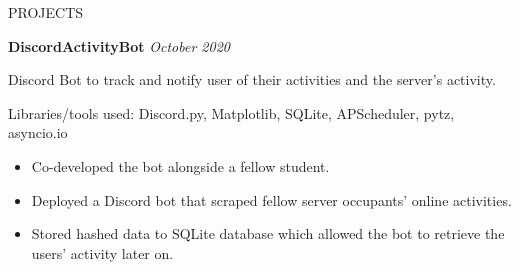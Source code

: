 \documentclass{ResumeFormat} %
\begin{document}
\begin{rSection}{PROJECTS}
\item \textbf{DiscordActivityBot} {} \hfill {\emph{October 2020}}

Discord Bot to track and notify user of their activities and the server’s activity.

Libraries/tools used: Discord.py, Matplotlib, SQLite, APScheduler, pytz, asyncio.io
\begin{itemize}
    \itemsep -3pt {}
     \item Co-developed the bot alongside a fellow student.
     \item Deployed a Discord bot that scraped fellow server occupants’ online activities.
     \item Stored hashed data to SQLite database which allowed the bot to retrieve the users' activity later on.
 \end{itemize}
\end{rSection} 





 
\end{document}
